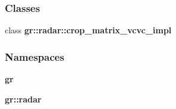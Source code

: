\subsubsection*{Classes}
\begin{DoxyCompactItemize}
\item 
class {\bf gr\+::radar\+::crop\+\_\+matrix\+\_\+vcvc\+\_\+impl}
\end{DoxyCompactItemize}
\subsubsection*{Namespaces}
\begin{DoxyCompactItemize}
\item 
 {\bf gr}
\item 
 {\bf gr\+::radar}
\end{DoxyCompactItemize}
